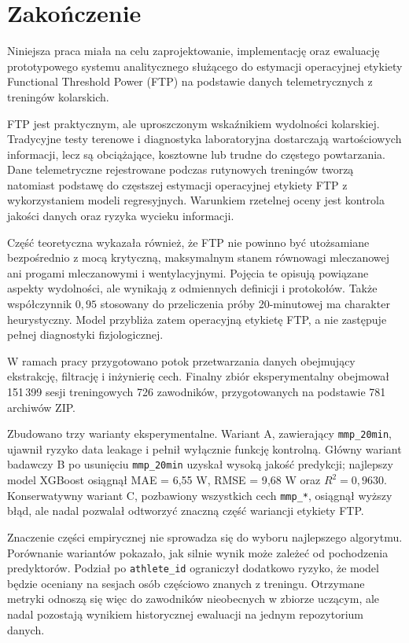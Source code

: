 \chapter*{Zakończenie}

Niniejsza praca miała na celu zaprojektowanie, implementację oraz ewaluację prototypowego systemu analitycznego służącego do estymacji operacyjnej etykiety Functional Threshold Power (FTP) na podstawie danych telemetrycznych z treningów kolarskich.

FTP jest praktycznym, ale uproszczonym wskaźnikiem wydolności kolarskiej. Tradycyjne testy terenowe i diagnostyka laboratoryjna dostarczają wartościowych informacji, lecz są obciążające, kosztowne lub trudne do częstego powtarzania. Dane telemetryczne rejestrowane podczas rutynowych treningów tworzą natomiast podstawę do częstszej estymacji operacyjnej etykiety FTP z wykorzystaniem modeli regresyjnych. Warunkiem rzetelnej oceny jest kontrola jakości danych oraz ryzyka wycieku informacji.

Część teoretyczna wykazała również, że FTP nie powinno być utożsamiane bezpośrednio z mocą krytyczną, maksymalnym stanem równowagi mleczanowej ani progami mleczanowymi i wentylacyjnymi. Pojęcia te opisują powiązane aspekty wydolności, ale wynikają z odmiennych definicji i protokołów. Także współczynnik $0{,}95$ stosowany do przeliczenia próby 20-minutowej ma charakter heurystyczny. Model przybliża zatem operacyjną etykietę FTP, a nie zastępuje pełnej diagnostyki fizjologicznej.

W ramach pracy przygotowano potok przetwarzania danych obejmujący ekstrakcję, filtrację i inżynierię cech. Finalny zbiór eksperymentalny obejmował 151\,399 sesji treningowych 726 zawodników, przygotowanych na podstawie 781 archiwów ZIP.

Zbudowano trzy warianty eksperymentalne. Wariant A, zawierający \texttt{mmp\_20min}, ujawnił ryzyko data leakage i pełnił wyłącznie funkcję kontrolną. Główny wariant badawczy B po usunięciu \texttt{mmp\_20min} uzyskał wysoką jakość predykcji; najlepszy model XGBoost osiągnął MAE = 6{,}55 W, RMSE = 9{,}68 W oraz $R^2 = 0{,}9630$. Konserwatywny wariant C, pozbawiony wszystkich cech \texttt{mmp\_*}, osiągnął wyższy błąd, ale nadal pozwalał odtworzyć znaczną część wariancji etykiety FTP.

Znaczenie części empirycznej nie sprowadza się do wyboru najlepszego algorytmu. Porównanie wariantów pokazało, jak silnie wynik może zależeć od pochodzenia predyktorów. Podział po \texttt{athlete\_id} ograniczył dodatkowo ryzyko, że model będzie oceniany na sesjach osób częściowo znanych z treningu. Otrzymane metryki odnoszą się więc do zawodników nieobecnych w zbiorze uczącym, ale nadal pozostają wynikiem historycznej ewaluacji na jednym repozytorium danych.

